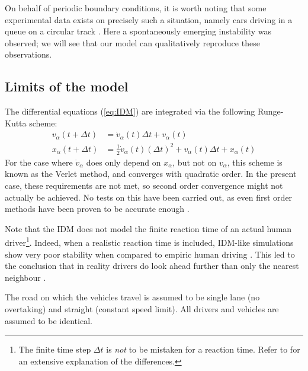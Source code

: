 On behalf of periodic boundary conditions, it is worth noting that some experimental data exists on precisely such a situation, namely cars driving in a queue on a circular track  \cite{nakayama2009,tadaki2013}. Here a spontaneously emerging instability was observed; we will see that our model can qualitatively reproduce these observations.


\subsection{Limits of the model}
The differential equations (\ref{eq:IDM}) are integrated via the following Runge-Kutta scheme:
\begin{align*}
v_\alpha(t+\Delta t) &= \dot v_\alpha(t)\Delta t+v_\alpha(t) \\
x_\alpha(t+\Delta t) &= \frac{1}{2}\dot v_\alpha(t) (\Delta t)^2 + v_\alpha(t)\Delta t + x_\alpha(t)
\end{align*}
For the case where $\dot v_\alpha$ does only depend on $x_\alpha$, but not on $v_\alpha$, this scheme is known as the Verlet method, and converges with quadratic order. In the present case, these requirements are not met, so second order convergence might not actually be achieved. No tests on this have been carried out, as even first order methods have been proven to be accurate enough \cite{treiber2015}.

Note that the IDM does not model the finite reaction time of an actual human driver\footnote{The finite time step $\Delta t$ is \emph{not} to be mistaken for a reaction time. Refer to \cite{treiber2006} for an extensive explanation of the differences.}. Indeed, when a realistic reaction time is included, IDM-like simulations show very poor stability when compared to empiric human driving . This led to the conclusion that in reality drivers do look ahead further than only the nearest neighbour \cite{treiber2006}.

The road on which the vehicles travel is assumed to be single lane (no overtaking) and straight (constant speed limit). All drivers and vehicles are assumed to be identical.

